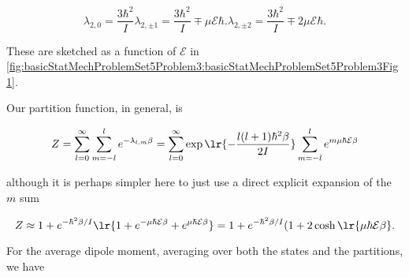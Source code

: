 {\begin{subequations}
\begin{equation}\label{eqn:basicStatMechProblemSet5Problem3:160}
\lambda_{2,0} = \frac{3 \hbar^2}{I} 
\end{equation}
\begin{equation}\label{eqn:basicStatMechProblemSet5Problem3:180}
\lambda_{2,\pm 1} = \frac{3 \hbar^2}{I} \mp \mu \mathcal{E} \hbar.
\end{equation}
\begin{equation}\label{eqn:basicStatMechProblemSet5Problem3:200}
\lambda_{2,\pm 2} = \frac{3 \hbar^2}{I} \mp 2 \mu \mathcal{E} \hbar.
\end{equation}
\end{subequations}

These are sketched as a function of $\mathcal{E}$ in \cref{fig:basicStatMechProblemSet5Problem3:basicStatMechProblemSet5Problem3Fig1}.



Our partition function, in general, is

\begin{dmath}\label{eqn:basicStatMechProblemSet5Problem3:220}
Z 
= \sum_{l = 0}^\infty \sum_{m = -l}^l e^{-\lambda_{l,m} \beta}
= \sum_{l = 0}^\infty \exp\lr{ -\frac{l (l+1) \hbar^2 \beta}{2 I}} \sum_{m = -l}^l e^{ m \mu \hbar \mathcal{E} \beta}
\end{dmath}


although it is perhaps simpler here to just use a direct explicit expansion of the $m$ sum 

\begin{equation}\label{eqn:basicStatMechProblemSet5Problem3:320}
Z 
\approx 
1 + e^{-\hbar^2 \beta/I} 
\lr{ 1 + e^{- \mu \hbar \mathcal{E} \beta } + e^{ \mu \hbar \mathcal{E} \beta}}
=
1 + e^{-\hbar^2 \beta/I} (1 + 2 \cosh\lr{ \mu \hbar \mathcal{E} \beta}.
\end{equation}


For the average dipole moment, averaging over both the states and the partitions, we have

}

